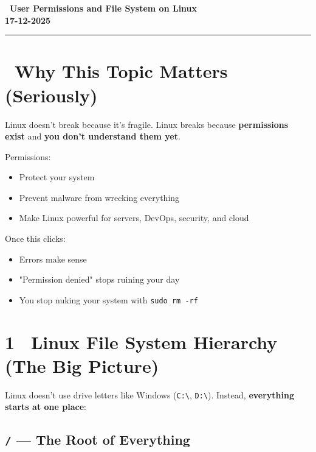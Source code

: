 \documentclass[12pt]{article}
\newcommand{\courseTitle}{User Permissions and File System on Linux}
\newcommand{\courseDate}{17-12-2025}
\newcommand{\penguinicon}{\faLinux}
\newcommand{\importanticon}{\faExclamationCircle}
\newcommand{\treeicon}{\faTree}
\begin{document}
\begin{center}
\headingfont\Huge\bfseries\color{navy}
\penguinicon\ \courseTitle\\[0.5em]
\Large\color{teamred}
\courseDate
\end{center}

\vspace{1em}
\begin{center}
\color{teamred}\rule{0.8\textwidth}{1pt}
\end{center}

\section*{\importanticon\ Why This Topic Matters (Seriously)}

Linux doesn't break because it's fragile.
Linux breaks because \textbf{permissions exist} and \textbf{you don't understand them yet}.

Permissions:

\begin{itemize}
    \item Protect your system
    \item Prevent malware from wrecking everything
    \item Make Linux powerful for servers, DevOps, security, and cloud
\end{itemize}

Once this clicks:

\begin{itemize}
    \item Errors make sense
    \item "Permission denied" stops ruining your day
    \item You stop nuking your system with \texttt{sudo rm -rf}
\end{itemize}

\section*{1 \treeicon\ Linux File System Hierarchy (The Big Picture)}

Linux doesn't use drive letters like Windows (\texttt{C:\textbackslash}, \texttt{D:\textbackslash}).
Instead, \textbf{everything starts at one place}:

\subsection*{\texttt{/} — The Root of Everything}
\end{document}
